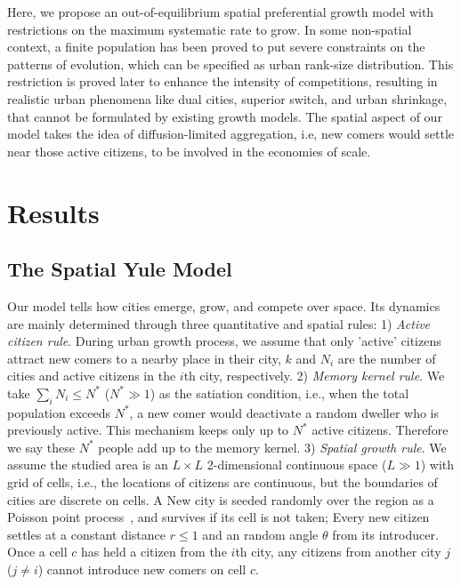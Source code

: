 \documentclass[reprint,unsortedaddress,amsmath,amssymb,aps,prl,showkeys]{revtex4-2}
\begin{document}


Here, we propose an out-of-equilibrium spatial preferential growth model with restrictions on the maximum systematic rate to grow. In some non-spatial context\cite{PhysRevE.55.R3817}, a finite population has been proved to put severe constraints on the patterns of  evolution, which can be specified as urban rank-size distribution. This restriction is proved later to enhance the intensity of competitions, resulting in realistic urban phenomena like dual cities\cite{silverman2018rethinking}, superior switch\cite{gabaix2004evolution}, and urban shrinkage\cite{haase2014conceptualizing}, that cannot be formulated by existing growth models. The spatial aspect of our model takes the idea of diffusion-limited aggregation\cite{makse1995modelling, rybski2013distance, kleinberg2000navigation}, i.e, new comers would settle near those active citizens, to be involved in the economies of scale.

\section{Results}

\subsection{The Spatial Yule Model}
Our model tells how cities emerge, grow, and compete over space. Its dynamics are mainly determined through three quantitative and spatial rules: 1) \textit{Active citizen rule}. During urban growth process, we assume that only 'active' citizens attract new comers to a nearby place in their city, $k$ and $N_i$ are the number of cities and active citizens in the $i$th city, respectively. 2) \textit{Memory kernel rule}. We take $\sum_{i} N_i \le N^*$ ($N^* \gg 1$) as the satiation condition, i.e., when the total population exceeds $N^*$, a new comer would deactivate a random dweller who is previously active. This mechanism keeps only up to $N^*$ active citizens. Therefore we say these $N^*$ people add up to the memory kernel. 3) \emph{Spatial growth rule}. We assume the studied area is an $L\times L$ 2-dimensional continuous space ($L\gg 1$) with grid of cells, %
i.e., the locations of citizens are continuous, but the boundaries of cities are discrete on cells. A New city is seeded randomly over the region as a Poisson point process~\cite{miles1970homogeneous}, and survives if its cell is not taken; Every new citizen settles at a constant distance $r\le 1$ and an random angle $\theta$ from its introducer. Once a cell $c$ has held a citizen from the $i$th city, any citizens from another city $j$ ($j\ne i$) cannot introduce new comers on cell $c$. 
\end{document}
